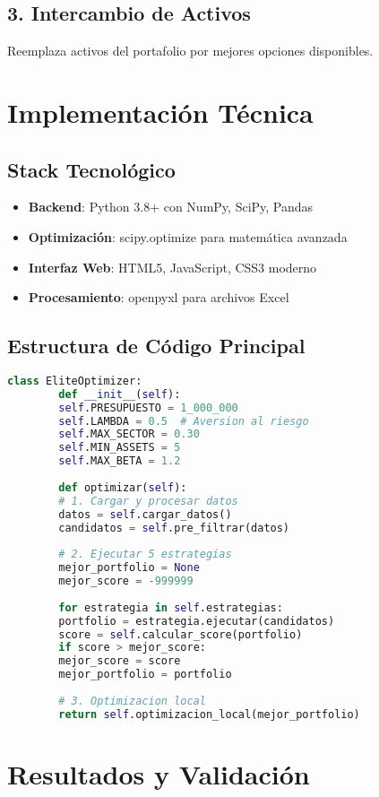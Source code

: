 \documentclass[11pt,a4paper]{article}
\begin{document}
	\subsection{3. Intercambio de Activos}
	Reemplaza activos del portafolio por mejores opciones disponibles.
	
	\section{Implementación Técnica}
	
	\subsection{Stack Tecnológico}
	\begin{itemize}
		\item \textbf{Backend}: Python 3.8+ con NumPy, SciPy, Pandas
		\item \textbf{Optimización}: scipy.optimize para matemática avanzada
		\item \textbf{Interfaz Web}: HTML5, JavaScript, CSS3 moderno
		\item \textbf{Procesamiento}: openpyxl para archivos Excel
	\end{itemize}
	
	\subsection{Estructura de Código Principal}
	\begin{lstlisting}[language=Python]
		class EliteOptimizer:
		def __init__(self):
		self.PRESUPUESTO = 1_000_000
		self.LAMBDA = 0.5  # Aversion al riesgo
		self.MAX_SECTOR = 0.30
		self.MIN_ASSETS = 5
		self.MAX_BETA = 1.2
		
		def optimizar(self):
		# 1. Cargar y procesar datos
		datos = self.cargar_datos()
		candidatos = self.pre_filtrar(datos)
		
		# 2. Ejecutar 5 estrategias
		mejor_portfolio = None
		mejor_score = -999999
		
		for estrategia in self.estrategias:
		portfolio = estrategia.ejecutar(candidatos)
		score = self.calcular_score(portfolio)
		if score > mejor_score:
		mejor_score = score
		mejor_portfolio = portfolio
		
		# 3. Optimizacion local
		return self.optimizacion_local(mejor_portfolio)
	\end{lstlisting}
	
	\section{Resultados y Validación}
	
\end{document}
